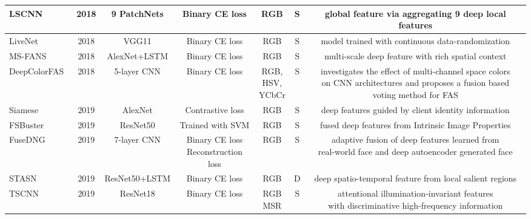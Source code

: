 \documentclass[10pt,journal,compsoc]{IEEEtran}
\begin{document}
\begin{table}
{\begin{tabular}{l c c c c c c}
   \midrule
LSCNN~\cite{de2018learning} & 2018 & 9 PatchNets & Binary CE loss & RGB & S & global feature via aggregating 9 deep local features \\ 



   \midrule
LiveNet~\cite{rehman2018livenet} & 2018 & VGG11 & Binary CE loss & RGB & S & model trained with continuous data-randomization  \\ 

  

   \midrule
MS-FANS~\cite{luo2018face} & 2018 & AlexNet+LSTM & Binary CE loss & RGB & S & multi-scale deep feature with rich spatial context \\ 


   \midrule
DeepColorFAS~\cite{larbi2018deepcolorfasd} & 2018 & 5-layer CNN  & Binary CE loss & \tabincell{c}{RGB,\\HSV,\\YCbCr} & S &  \tabincell{c}{investigates the effect of multi-channel space colors\\ on CNN architectures and proposes a fusion based\\ voting method for FAS} \\ 


   \midrule
Siamese~\cite{hao2019face} & 2019 & AlexNet & Contrastive loss & RGB & S & deep features guided by client identity information  \\ 

   \midrule
FSBuster~\cite{bresan2019facespoof} & 2019 & ResNet50 & Trained with SVM & RGB & S & fused deep features from Intrinsic Image Properties  \\ 

 


   \midrule
FuseDNG~\cite{rehman2019face} & 2019 & 7-layer CNN  & \tabincell{c}{Binary CE loss\\Reconstruction loss} & RGB & S & \tabincell{c}{adaptive fusion of deep features learned from\\ real-world face and deep autoencoder generated face }  \\ 
 
 \midrule
 STASN~\cite{yang2019face} & 2019 & ResNet50+LSTM & Binary CE loss & RGB & D & deep spatio-temporal feature from local salient regions\\

 \midrule
TSCNN~\cite{chen2019attention} & 2019 & ResNet18  & Binary CE loss & \tabincell{c}{RGB\\MSR} & S & \tabincell{c}{ attentional illumination-invariant features\\ with discriminative high-frequency information}\\



\end{tabular}}
\end{table}
\end{document}
